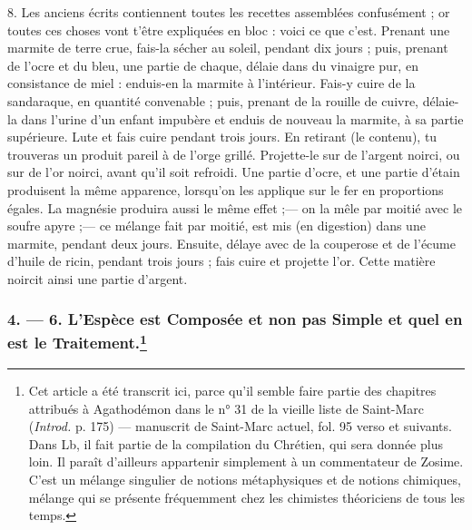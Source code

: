 \documentclass[a4paper, 11pt, oneside, polutonikogreek, french]{article}
\begin{document}
8. Les anciens écrits contiennent toutes les recettes assemblées confusément ; or toutes ces choses vont t'être expliquées en bloc : voici ce que c'est. Prenant une marmite de terre crue, fais-la sécher au soleil, pendant dix jours ; puis, prenant de l'ocre et du bleu, une partie de chaque, délaie dans du vinaigre pur, en consistance de miel : enduis-en la marmite à l'intérieur. Fais-y cuire de la sandaraque, en quantité convenable ; puis, prenant de la rouille de cuivre, délaie-la dans l'urine d'un enfant impubère et enduis de nouveau la marmite, à sa partie supérieure. Lute et fais cuire pendant trois jours. En retirant (le contenu), tu trouveras un produit pareil à de l'orge grillé. Projette-le sur de l'argent noirci, ou sur de l'or noirci, avant qu'il soit refroidi. Une partie d'ocre, et une partie d'étain produisent la même apparence, lorsqu'on les applique sur le fer en proportions égales. La magnésie produira aussi le même effet ;--- on la mêle par moitié avec le soufre apyre ;--- ce mélange fait par moitié, est mis (en digestion) dans une marmite, pendant deux jours. Ensuite, délaye avec de la couperose et de l'écume d'huile de ricin, pendant trois jours ; fais cuire et projette l'or. Cette matière noircit ainsi une partie d'argent.

\bigskip
\centerline{\EightStarTaper}
\centerline{\EightStarTaper\EightStarTaper}
\bigskip

\subsubsection[4. --- 6. L'Espèce est Composée et non pas Simple et quel en est le Traitement.]{4. --- 6. L'Espèce est Composée et non pas Simple et quel en est le Traitement.\footnote{Cet article a été transcrit ici, parce qu'il semble faire partie des chapitres attribués à Agathodémon dans le n° 31 de la vieille liste de Saint-Marc (\emph{Introd.} p. 175) --- manuscrit de Saint-Marc actuel, fol. 95 verso et suivants. Dans Lb, il fait partie de la compilation du Chrétien, qui sera donnée plus loin. Il paraît d'ailleurs appartenir simplement à un commentateur de Zosime. C'est un mélange singulier de notions métaphysiques et de notions chimiques, mélange qui se présente fréquemment chez les chimistes théoriciens de tous les temps.}}
\end{document}

